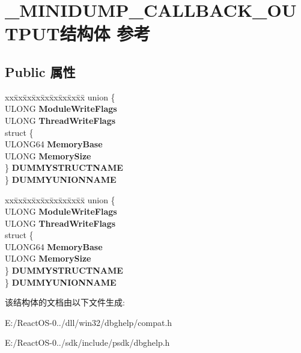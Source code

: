 \hypertarget{struct___m_i_n_i_d_u_m_p___c_a_l_l_b_a_c_k___o_u_t_p_u_t}{}\section{\+\_\+\+M\+I\+N\+I\+D\+U\+M\+P\+\_\+\+C\+A\+L\+L\+B\+A\+C\+K\+\_\+\+O\+U\+T\+P\+U\+T结构体 参考}
\label{struct___m_i_n_i_d_u_m_p___c_a_l_l_b_a_c_k___o_u_t_p_u_t}
\subsection*{Public 属性}
\begin{DoxyCompactItemize}
\item 
\mbox{\label{struct___m_i_n_i_d_u_m_p___c_a_l_l_b_a_c_k___o_u_t_p_u_t_a454792132688e8097607809bba034873}} 
\begin{tabbing}
xx\=xx\=xx\=xx\=xx\=xx\=xx\=xx\=xx\=\kill
union \{\\
\>ULONG {\bfseries ModuleWriteFlags}\\
\>ULONG {\bfseries ThreadWriteFlags}\\
\>struct \{\\
\>\>ULONG64 {\bfseries MemoryBase}\\
\>\>ULONG {\bfseries MemorySize}\\
\>\} {\bfseries DUMMYSTRUCTNAME}\\
\} {\bfseries DUMMYUNIONNAME}\\

\end{tabbing}\item 
\mbox{\label{struct___m_i_n_i_d_u_m_p___c_a_l_l_b_a_c_k___o_u_t_p_u_t_abaf63a20047f788c11e3b80c830b57c4}} 
\begin{tabbing}
xx\=xx\=xx\=xx\=xx\=xx\=xx\=xx\=xx\=\kill
union \{\\
\>ULONG {\bfseries ModuleWriteFlags}\\
\>ULONG {\bfseries ThreadWriteFlags}\\
\>struct \{\\
\>\>ULONG64 {\bfseries MemoryBase}\\
\>\>ULONG {\bfseries MemorySize}\\
\>\} {\bfseries DUMMYSTRUCTNAME}\\
\} {\bfseries DUMMYUNIONNAME}\\

\end{tabbing}\end{DoxyCompactItemize}


该结构体的文档由以下文件生成\+:\begin{DoxyCompactItemize}
\item 
E\+:/\+React\+O\+S-\/0../dll/win32/dbghelp/compat.\+h\item 
E\+:/\+React\+O\+S-\/0../sdk/include/psdk/dbghelp.\+h\end{DoxyCompactItemize}
